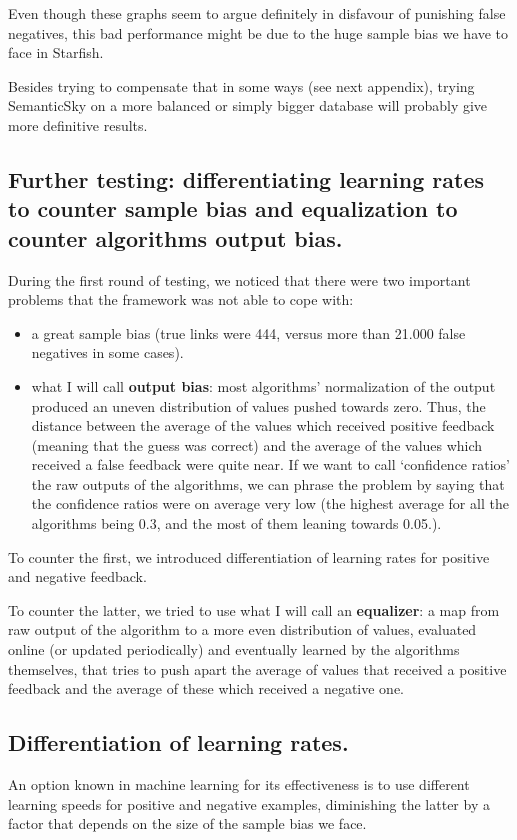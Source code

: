 \documentclass[11pt]{article}
\begin{document}
Even though these graphs seem to argue definitely in disfavour of punishing false negatives, this bad performance might be due to the huge sample bias we have to face in Starfish.

Besides trying to compensate that in some ways (see next appendix), trying SemanticSky on a more balanced or simply bigger database will probably give more definitive results.





\subsection{Further testing: differentiating learning rates to counter sample bias and equalization to counter algorithms output bias.}

During the first round of testing, we noticed that there were two important problems that the framework was not able to cope with:
\begin{itemize}
\item a great sample bias (true links were 444, versus more than 21.000 false negatives in some cases).
\item what I will call \textbf{output bias}: most algorithms' normalization of the output produced an uneven distribution of values pushed towards zero. Thus, the distance between the average of the values which received positive feedback (meaning that the guess was correct) and the average of the values which received a false feedback were quite near. If we want to call `confidence ratios' the raw outputs of the algorithms, we can phrase the problem by saying that the confidence ratios were on average very low (the highest average for all the algorithms being 0.3, and the most of them leaning towards 0.05.).
\end{itemize}

To counter the first, we introduced differentiation of learning rates for positive and negative feedback.

To counter the latter, we tried to use what I will call an \textbf{equalizer}: a map from raw output of the algorithm to a more even distribution of values, evaluated online (or updated periodically) and eventually learned by the algorithms themselves, that tries to push apart the average of values that received a positive feedback and the average of these which received a negative one.

\subsection{Differentiation of learning rates.}
An option known in machine learning for its effectiveness is to use different learning speeds for positive and negative examples, diminishing the latter by a factor that depends on the size of the sample bias we face.
\end{document}
